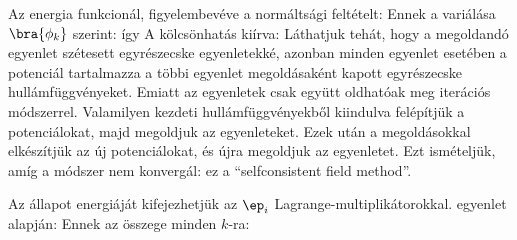    Az energia funkcionál, figyelembevéve a normáltsági feltételt:
   Ennek a variálása $\bra{\phi_k}$ szerint:
   így
   A kölcsönhatás kiírva:
   Láthatjuk tehát, hogy a megoldandó egyenlet szétesett egyrészecske egyenletekké, azonban minden egyenlet esetében a potenciál tartalmazza a többi egyenlet megoldásaként kapott egyrészecske hullámfüggvényeket.
   Emiatt az egyenletek csak együtt oldhatóak meg iterációs módszerrel.
   Valamilyen kezdeti hullámfüggvényekből kiindulva felépítjük a potenciálokat, majd megoldjuk az egyenleteket.
   Ezek után a megoldásokkal elkészítjük az új potenciálokat, és újra megoldjuk az egyenletet.
   Ezt ismételjük, amíg a módszer nem konvergál: ez a ``selfconsistent field method''.
   
   Az állapot energiáját kifejezhetjük az $\ep_i$ Lagrange-multiplikátorokkal.  egyenlet alapján:
   Ennek az összege minden $k$-ra:
   
